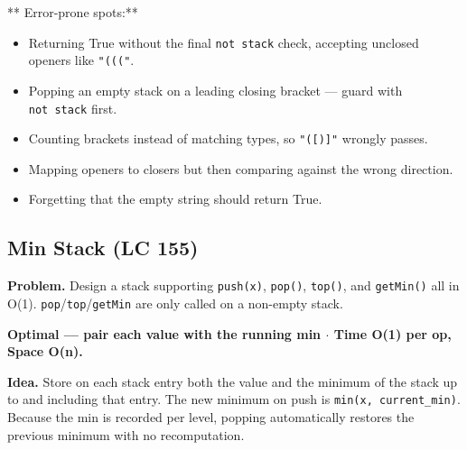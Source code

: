 \documentclass[11pt]{article}
\providecommand{\tightlist}{\setlength{\itemsep}{1pt}\setlength{\parskip}{0pt}}
\begin{document}
** Error-prone spots:**

\begin{itemize}
\tightlist
\item
  Returning True without the final \texttt{not\ stack} check, accepting unclosed openers like \texttt{"((("}.
\item
  Popping an empty stack on a leading closing bracket --- guard with \texttt{not\ stack} first.
\item
  Counting brackets instead of matching types, so \texttt{"({[}){]}"} wrongly passes.
\item
  Mapping openers to closers but then comparing against the wrong direction.
\item
  Forgetting that the empty string should return True.
\end{itemize}

\subsection{Min Stack (LC 155)}\label{min-stack-lc-155}

\textbf{Problem.} Design a stack supporting \texttt{push(x)}, \texttt{pop()}, \texttt{top()}, and \texttt{getMin()} all in O(1). \texttt{pop}/\texttt{top}/\texttt{getMin} are only called on a non-empty stack.

\textbf{Optimal --- pair each value with the running min \(\cdot\) Time O(1) per op, Space O(n).}

\textbf{Idea.} Store on each stack entry both the value and the minimum of the stack up to and including that entry. The new minimum on push is \texttt{min(x,\ current\_min)}. Because the min is recorded per level, popping automatically restores the previous minimum with no recomputation.

\end{document}
